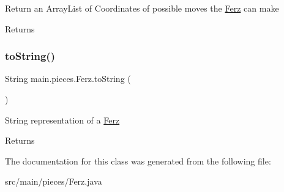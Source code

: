 Return an Array\+List of Coordinates of possible moves the \hyperlink{classmain_1_1pieces_1_1_ferz}{Ferz} can make \begin{DoxyReturn}{Returns}

\end{DoxyReturn}
\hypertarget{classmain_1_1pieces_1_1_ferz_ad4b187dafd0c861a6dbb0874e4245b79}{}\label{classmain_1_1pieces_1_1_ferz_ad4b187dafd0c861a6dbb0874e4245b79} 
\subsubsection{\texorpdfstring{to\+String()}{toString()}}
{\footnotesize\ttfamily String main.\+pieces.\+Ferz.\+to\+String (\begin{DoxyParamCaption}{ }\end{DoxyParamCaption})}

String representation of a \hyperlink{classmain_1_1pieces_1_1_ferz}{Ferz} \begin{DoxyReturn}{Returns}

\end{DoxyReturn}


The documentation for this class was generated from the following file\+:\begin{DoxyCompactItemize}
\item 
src/main/pieces/Ferz.\+java\end{DoxyCompactItemize}
